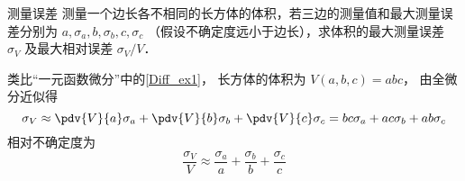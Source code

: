 \begin{exam}{测量误差}
测量一个边长各不相同的长方体的体积，若三边的测量值和最大测量误差分别为 $a, \sigma_a, b, \sigma_b, c, \sigma_c$ （假设不确定度远小于边长），求体积的最大测量误差 $\sigma_V$ 及最大相对误差 $\sigma_V/V$．

类比“一元函数微分”中的\autoref{Diff_ex1}， 长方体的体积为 $V(a,b,c) = abc$， 由全微分近似得
\begin{equation}
{\sigma _V} \approx \pdv{V}{a} \sigma _a + \pdv{V}{b} \sigma _b + \pdv{V}{c} \sigma _c = bc{\sigma _a} + ac{\sigma _b} + ab{\sigma _c}
\end{equation}
相对不确定度为
\begin{equation}
\frac{\sigma _V}{V} \approx \frac{\sigma _a}{a} + \frac{\sigma _b}{b} + \frac{\sigma _c}{c}
\end{equation}

\end{exam}